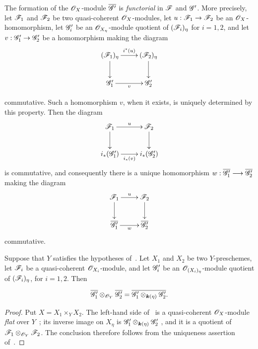 \begin{env}[2.8.3]
\label{IV.2.8.3}
The formation of the $\mathscr{O}_X$-module $\overline{\mathscr{G}'}$ is
\emph{functorial} in $\mathscr{F}$ and $\mathscr{G}'$. More precisely, let
$\mathscr{F}_1$ and $\mathscr{F}_2$ be two quasi-coherent
$\mathscr{O}_X$-modules, let
$u:\mathscr{F}_1\to\mathscr{F}_2$ be an $\mathscr{O}_X$-homomorphism, let
$\mathscr{G}'_i$ be an $\mathscr{O}_{X_\eta}$-module quotient of
$(\mathscr{F}_i)_\eta$ for $i=1,2$, and let
$v:\mathscr{G}'_1\to\mathscr{G}'_2$ be a homomorphism making the diagram
\[
\xymatrix{
  (\sh{F}_1)_\eta \ar[r]^{i^*(u)} \ar[d]
    &(\sh{F}_2)_\eta \ar[d] \\
  \sh{G}'_1 \ar[r]_v
    &\sh{G}'_2
}
\]


commutative. Such a homomorphism $v$, when it exists, is uniquely
determined by this property. Then the diagram
\[
\xymatrix{
  \sh{F}_1 \ar[r]^u \ar[d]
    &\sh{F}_2 \ar[d] \\
  i_*(\sh{G}'_1) \ar[r]_{i_*(v)}
    &i_*(\sh{G}'_2)
}
\]
is commutative, and consequently there is a unique homomorphism $w:\overline{\mathscr{G}'_1}\longrightarrow\overline{\mathscr{G}'_2}$
making the diagram
\[
\xymatrix{
  \sh{F}_1 \ar[r]^u \ar[d]
    &\sh{F}_2 \ar[d] \\
  \overline{\sh{G}'_1} \ar[r]_w
    &\overline{\sh{G}'_2}
}
\]
commutative.
\end{env}

\begin{proposition}[2.8.4]
\label{IV.2.8.4}
Suppose that $Y$ satisfies the hypotheses of~. Let
$X_1$ and $X_2$ be two $Y$-preschemes, let $\mathscr{F}_i$ be a
quasi-coherent $\mathscr{O}_{X_i}$-module, and let $\mathscr{G}'_i$ be an
$\mathscr{O}_{(X_i)_\eta}$-module quotient of $(\mathscr{F}_i)_\eta$, for
$i=1,2$. Then
\end{proposition}

\begin{env}[2.8.4.1]
\label{IV.2.8.4.1}
\[
  \overline{\mathscr{G}'_1}\otimes_{\mathscr{O}_Y}\overline{\mathscr{G}'_2}
    =
  \overline{\mathscr{G}'_1\otimes_{\boldsymbol{k}(\eta)}\mathscr{G}'_2}.
\]
\end{env}

\begin{proof}
Put $X=X_1\times_Y X_2$. The left-hand side
of~ is a quasi-coherent $\mathscr{O}_X$-module \emph{flat} over
$Y$~; its inverse image on $X_\eta$ is $\mathscr{G}'_1\otimes_{\boldsymbol{k}(\eta)}\mathscr{G}'_2$
, and it is a quotient of
$\mathscr{F}_1\otimes_{\mathscr{O}_Y}\mathscr{F}_2$. The conclusion therefore
follows from the uniqueness assertion of~.
\end{proof}


